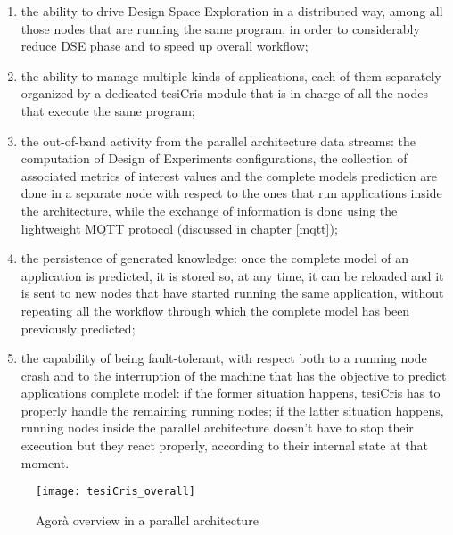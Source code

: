 \begin{enumerate}
    
    \item the ability to drive Design Space Exploration in a distributed way, among all those nodes that are running the same program, in order to considerably reduce DSE phase and to speed up overall workflow;
    
    \item the ability to manage multiple kinds of applications, each of them separately organized by a dedicated tesiCris module that is in charge of all the nodes that execute the same program;
    
    \item the out-of-band activity from the parallel architecture data streams: the computation of Design of Experiments configurations, the collection of associated metrics of interest values and the complete models prediction are done in a separate node with respect to the ones that run applications inside the architecture, while the exchange of information is done using the lightweight MQTT protocol (discussed in chapter \ref{mqtt});
    
    \item the persistence of generated knowledge: once the complete model of an application is predicted, it is stored so, at any time, it can be reloaded and it is sent to new nodes that have started running the same application, without repeating all the workflow through which the complete model has been previously predicted;
    
    \item the capability of being fault-tolerant, with respect both to a running node crash and to the interruption of the machine that has the objective to predict applications complete model: if the former situation happens, tesiCris has to properly handle the remaining running nodes; if the latter situation happens, running nodes inside the parallel architecture doesn't have to stop their execution but they react properly, according to their internal state at that moment.

\end{enumerate}

\begin{figure}[H]

    \centering
    \texttt{[image: tesiCris\_overall]}
    \caption{Agorà overview in a parallel architecture}
    \label{fig::tesiCris_overview}
    
\end{figure}


